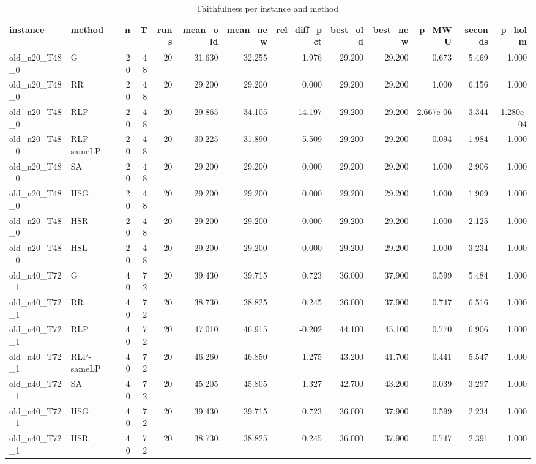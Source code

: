 \begin{table}[htbp]
\centering
\small
\caption{Faithfulness per instance and method}
\label{tab:faithfulness_detail}
\begin{tabular}{llrrrrrrrrrrr}
\toprule
instance & method & n & T & runs & mean\_old & mean\_new & rel\_diff\_pct & best\_old & best\_new & p\_MWU & seconds & p\_holm \\
\midrule
old\_n20\_T48\_0 & G & 20 & 48 & 20 & 31.630 & 32.255 & 1.976 & 29.200 & 29.200 & 0.673 & 5.469 & 1.000 \\
old\_n20\_T48\_0 & RR & 20 & 48 & 20 & 29.200 & 29.200 & 0.000 & 29.200 & 29.200 & 1.000 & 6.156 & 1.000 \\
old\_n20\_T48\_0 & RLP & 20 & 48 & 20 & 29.865 & 34.105 & 14.197 & 29.200 & 29.200 & 2.667e-06 & 3.344 & 1.280e-04 \\
old\_n20\_T48\_0 & RLP-sameLP & 20 & 48 & 20 & 30.225 & 31.890 & 5.509 & 29.200 & 29.200 & 0.094 & 1.984 & 1.000 \\
old\_n20\_T48\_0 & SA & 20 & 48 & 20 & 29.200 & 29.200 & 0.000 & 29.200 & 29.200 & 1.000 & 2.906 & 1.000 \\
old\_n20\_T48\_0 & HSG & 20 & 48 & 20 & 29.200 & 29.200 & 0.000 & 29.200 & 29.200 & 1.000 & 1.969 & 1.000 \\
old\_n20\_T48\_0 & HSR & 20 & 48 & 20 & 29.200 & 29.200 & 0.000 & 29.200 & 29.200 & 1.000 & 2.125 & 1.000 \\
old\_n20\_T48\_0 & HSL & 20 & 48 & 20 & 29.200 & 29.200 & 0.000 & 29.200 & 29.200 & 1.000 & 3.234 & 1.000 \\
old\_n40\_T72\_1 & G & 40 & 72 & 20 & 39.430 & 39.715 & 0.723 & 36.000 & 37.900 & 0.599 & 5.484 & 1.000 \\
old\_n40\_T72\_1 & RR & 40 & 72 & 20 & 38.730 & 38.825 & 0.245 & 36.000 & 37.900 & 0.747 & 6.516 & 1.000 \\
old\_n40\_T72\_1 & RLP & 40 & 72 & 20 & 47.010 & 46.915 & -0.202 & 44.100 & 45.100 & 0.770 & 6.906 & 1.000 \\
old\_n40\_T72\_1 & RLP-sameLP & 40 & 72 & 20 & 46.260 & 46.850 & 1.275 & 43.200 & 41.700 & 0.441 & 5.547 & 1.000 \\
old\_n40\_T72\_1 & SA & 40 & 72 & 20 & 45.205 & 45.805 & 1.327 & 42.700 & 43.200 & 0.039 & 3.297 & 1.000 \\
old\_n40\_T72\_1 & HSG & 40 & 72 & 20 & 39.430 & 39.715 & 0.723 & 36.000 & 37.900 & 0.599 & 2.234 & 1.000 \\
old\_n40\_T72\_1 & HSR & 40 & 72 & 20 & 38.730 & 38.825 & 0.245 & 36.000 & 37.900 & 0.747 & 2.391 & 1.000 \\

\end{tabular}
\end{table}
